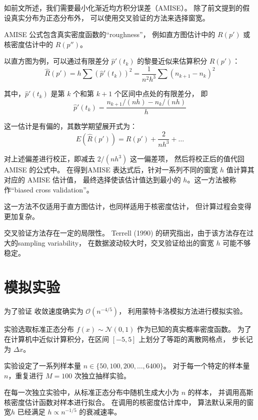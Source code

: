 \documentclass[UTF8]{ctexart}
\begin{document}
如前文所述，我们需要最小化渐近均方积分误差（AMISE）。
除了前文提到的假设真实分布为正态分布外，
可以使用交叉验证的方法来选择窗宽。

AMISE 公式包含真实密度函数的“roughness”，
例如直方图估计中的 $R(p')$ 或核密度估计中的 $R(p'')$。

以直方图为例，可以通过有限差分 $\hat{p}'(t_k)$ 的黎曼近似来估算积分 $R(p')$：
\begin{equation}
\hat{R}(p') = h \sum (\hat{p}'(t_k))^2 = \frac{1}{n^2h^3}\sum(n_{k+1} - n_k)^2
\end{equation}

其中，$\hat{p}'(t_k)$ 是第 $k$ 个和第 $k+1$ 个区间中点处的有限差分，
即
\begin{equation}
    \hat{p}'(t_k) = \frac{n_{k+1}/(nh) - n_k/(nh)}{h}
\end{equation}

这一估计是有偏的，其数学期望展开式为：
\begin{equation}
E(\hat{R}(p')) = R(p') + \frac{2}{nh^3} + \dots
\end{equation}

对上述偏差进行校正，即减去 $2/(nh^3)$ 这一偏差项，
然后将校正后的值代回 AMISE 的公式中。
在得到AMISE 表达式后，针对一系列不同的窗宽 $h$ 值计算其对应的 AMISE 估计值，
最终选择使该估计值达到最小的 $h$。这一方法被称作“biased cross validation”。

这一方法不仅适用于直方图估计，也同样适用于核密度估计，
但计算过程会变得更加复杂。

交叉验证方法存在一定的局限性。
Terrell (1990) 的研究指出，由于该方法存在过大的sampling variability，
在数据波动较大时，交叉验证给出的窗宽 $h$ 可能不够稳定。

\section{模拟实验}

为了验证
收敛速度确实为 $\mathcal{O}(n^{-4/5})$，
利用蒙特卡洛模拟方法进行模拟实验。

实验选取标准正态分布 $f(x) \sim \mathcal{N}(0, 1)$ 作为已知的真实概率密度函数。
为了在计算机中近似计算积分，在区间 $[-5, 5]$ 上划分了等距的离散网格点，
步长记为 $\Delta x$。

实验设定了一系列样本量 $n \in \{50, 100, 200, \dots, 6400\}$。
对于每一个特定的样本量 $n$，重复进行 $M=100$ 次独立抽样实验。

在每一次独立实验中，从标准正态分布中随机生成大小为 $n$ 的样本，
并调用高斯核密度估计函数对样本进行拟合。
在调用的核密度估计库中，
算法默认采用的窗宽$h$ 已经满足 $h \propto n^{-1/5}$ 的衰减速率。
\end{document}

